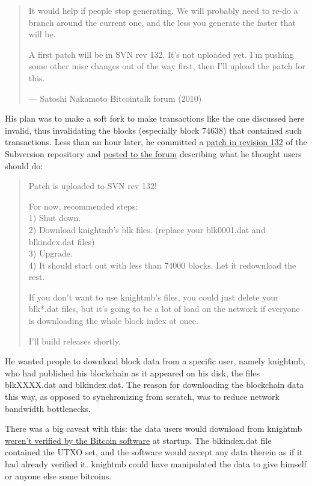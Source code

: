 \begin{quote}
It would help if people stop generating. We will probably need to re-do
a branch around the current one, and the less you generate the faster
that will be.

A first patch will be in SVN rev 132. It's not uploaded yet. I'm pushing
some other misc changes out of the way first, then I'll upload the patch
for this.

---  Satoshi Nakamoto Bitcointalk forum (2010)
\end{quote}

His plan was to make a soft fork to make transactions like the one
discussed here invalid, thus invalidating the blocks (especially block
74638) that contained such transactions. Less than an hour later, he
committed a \href{https://sourceforge.net/p/bitcoin/code/132/}{patch in
revision 132} of the Subversion repository and
\href{https://bitcointalk.org/index.php?topic=823.msg9548\#msg9548}{posted
to the forum} describing what he thought users should do:

\begin{quote}
Patch is uploaded to SVN rev 132!

For now, recommended steps:\\
1) Shut down.\\
2) Download knightmb's blk files. (replace your blk0001.dat and
blkindex.dat files)\\
3) Upgrade.\\
4) It should start out with less than 74000 blocks. Let it redownload
the rest.

If you don't want to use knightmb's files, you could just delete your
blk*.dat files, but it's going to be a lot of load on the network if
everyone is downloading the whole block index at once.

I'll build releases shortly.
\end{quote}

He wanted people to download block data from a specific user, namely
knightmb, who had published his blockchain as it appeared on his disk,
the files blkXXXX.dat and blkindex.dat. The reason for downloading the
blockchain data this way, as opposed to synchronizing from scratch, was
to reduce network bandwidth bottlenecks.

There was a big caveat with this: the data users would download from
knightmb \href{https://bitcoin.stackexchange.com/a/113682/69518}{weren't
verified by the Bitcoin software} at startup. The blkindex.dat file
contained the UTXO set, and the software would accept any data therein
as if it had already verified it. knightmb could have manipulated the
data to give himself or anyone else some bitcoins.

